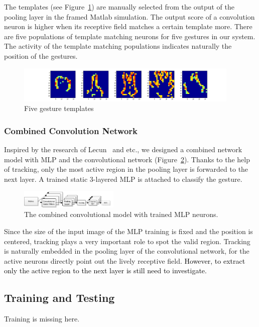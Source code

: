 \documentclass[journal]{journal}
\begin{document}
The templates (see Figure~\ref{fig:template}) are manually selected from the output of the pooling layer in the framed Matlab simulation. 
The output score of a convolution neuron is higher when its receptive field matches a certain template more. 
There are five populations of template matching neurons for five gestures in our system. 
The activity of the template matching populations indicates naturally the position of the gestures.

\begin{figure}
\centering
	\includegraphics[width=0.95\textwidth]{pics/guesture.png}
	\caption{Five gesture templates}
	\label{fig:template}
\end{figure}

\subsubsection{Combined Convolution Network}
Inspired by the research of Lecun~\cite{lecun1998gradient} and etc., we designed a combined network model with MLP and the convolutional network (Figure~\ref{fig:model2}). 
Thanks to the help of tracking, only the most active region in the pooling layer is forwarded to the next layer. 
A trained static 3-layered MLP is attached to classify the gesture.

\begin{figure}
\centering
	\includegraphics[width=0.42\textwidth]{pics/model2.pdf}
	\caption{The combined convolutional model with trained MLP neurons.}
	\label{fig:model2}
\end{figure}

Since the size of the input image of the MLP training is fixed and the position is centered, tracking plays a very important role to spot the valid region. 
Tracking is naturally embedded in the pooling layer of the convolutional network, for the active neurons directly point out the lively receptive field. 
\textcolor{black}{However, to extract only the active region to the next layer is still need to investigate.}

\subsection{Training and Testing}
\label{sec:tat}
Training is missing here.
\end{document}
